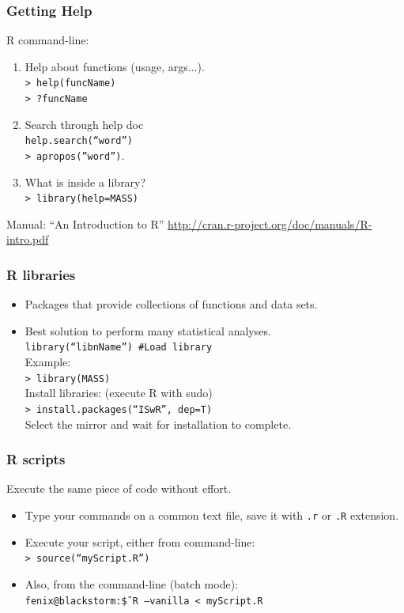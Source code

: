 \documentclass{beamer}
\begin{document}
\begin{frame}

\frametitle{Getting Help}
  R command-line:
  \begin{enumerate}
   \item Help about functions (usage, args...).\\
   \texttt{> help(funcName)}\\
   \texttt{> ?funcName} 
   \item Search through help doc\\
   \texttt{help.search(``word'')}\\
   \texttt{> apropos(''word'')}.
   \item What is inside a library?\\
   \texttt{> library(help=MASS)}
   \end{enumerate}
  Manual: ``An Introduction to R'' \url{http://cran.r-project.org/doc/manuals/R-intro.pdf}

\end{frame}


\begin{frame}

 \frametitle{R libraries}
 \begin{itemize}
  \item Packages that provide collections of functions
  and data sets.
  \item Best solution to perform many statistical
 analyses.\\
  \texttt{library(``libnName'') \#Load library}\\
  Example:\\
  \texttt{> library(MASS)}\\
  Install libraries: (execute R with sudo)\\
  \texttt{> install.packages(``ISwR'', dep=T)}\\
  Select the mirror and wait for installation to complete.
 \end{itemize}

\end{frame}


\begin{frame}

 \frametitle{R scripts}
 Execute the same piece of code without effort.
 \begin{itemize}
  \item Type your commands on a common text
  file, save it with \texttt{.r} or \texttt{.R} extension.
  \item Execute your script, either from command-line:\\
  \texttt{> source(``myScript.R'')}
  \item Also, from the command-line (batch mode):\\
  \texttt{fenix@blackstorm:\~\$ R --vanilla < myScript.R}
 \end{itemize}

\end{frame}
\end{document}
